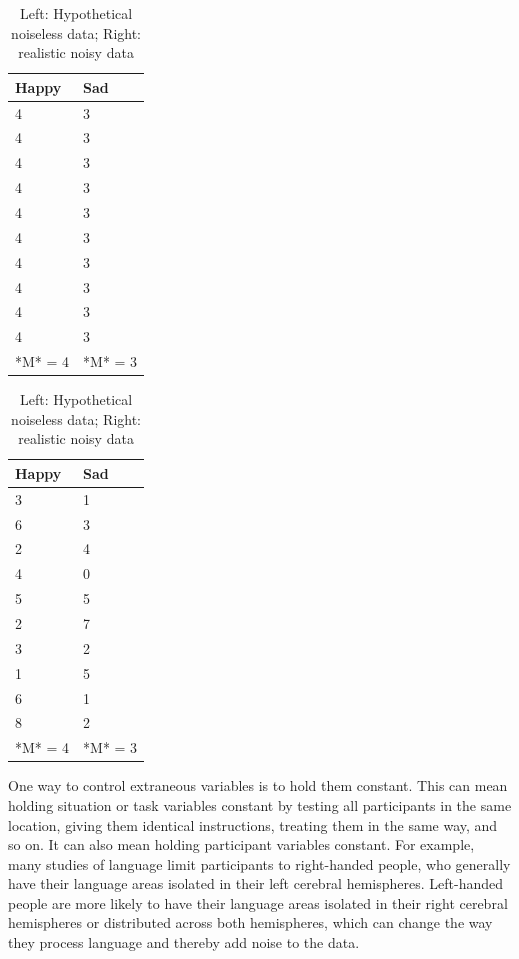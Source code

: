 \documentclass[
]{krantz}
\begin{document}
\begin{table}
\caption{\label{tab:noise}Left: Hypothetical noiseless data; Right: realistic noisy data}

\centering
\begin{tabular}[t]{l|l}
\hline
Happy & Sad\\
\hline
4 & 3\\
\hline
4 & 3\\
\hline
4 & 3\\
\hline
4 & 3\\
\hline
4 & 3\\
\hline
4 & 3\\
\hline
4 & 3\\
\hline
4 & 3\\
\hline
4 & 3\\
\hline
4 & 3\\
\hline
*M* = 4 & *M* = 3\\
\hline
\end{tabular}
\centering
\begin{tabular}[t]{l|l}
\hline
Happy & Sad\\
\hline
3 & 1\\
\hline
6 & 3\\
\hline
2 & 4\\
\hline
4 & 0\\
\hline
5 & 5\\
\hline
2 & 7\\
\hline
3 & 2\\
\hline
1 & 5\\
\hline
6 & 1\\
\hline
8 & 2\\
\hline
*M* = 4 & *M* = 3\\
\hline
\end{tabular}
\end{table}

One way to control extraneous variables is to hold them constant. This can mean holding situation or task variables constant by testing all participants in the same location, giving them identical instructions, treating them in the same way, and so on. It can also mean holding participant variables constant. For example, many studies of language limit participants to right-handed people, who generally have their language areas isolated in their left cerebral hemispheres. Left-handed people are more likely to have their language areas isolated in their right cerebral hemispheres or distributed across both hemispheres, which can change the way they process language and thereby add noise to the data.
\end{document}
